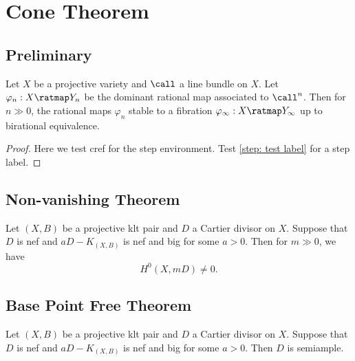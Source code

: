 \section{Cone Theorem}


\subsection{Preliminary}

    \begin{theorem}\label{thm: Iitaka fibration}
        Let \(X\) be a projective variety and \(\call\) a line bundle on \(X\).
        Let \(\varphi_n: X \ratmap Y_n\) be the dominant rational map associated to \(\call^n\).
        Then for \(n \gg 0\), the rational maps \(\varphi_n\) stable to a fibration \(\varphi_\infty: X \ratmap Y_\infty\) up to birational equivalence.
    \end{theorem}

    \begin{proof}
        Here we test cref for the step environment.
        Test \cref{step: test label} for a step label.
    \end{proof}


\subsection{Non-vanishing Theorem}

    \begin{theorem}\label{thm: non-vanishing theorem}
        Let \((X,B)\) be a projective klt pair and \(D\) a Cartier divisor on \(X\).
        Suppose that \(D\) is nef and \(aD-K_{(X,B)}\) is nef and big for some \(a > 0\).
        Then for \(m \gg 0\), we have 
        \[ H^0(X,mD) \neq 0. \]
    \end{theorem}


\subsection{Base Point Free Theorem}

    \begin{theorem}\label{thm: base point free theorem}
        Let \((X,B)\) be a projective klt pair and \(D\) a Cartier divisor on \(X\).
        Suppose that \(D\) is nef and \(aD-K_{(X,B)}\) is nef and big for some \(a > 0\).
        Then \(D\) is semiample.
    \end{theorem}


